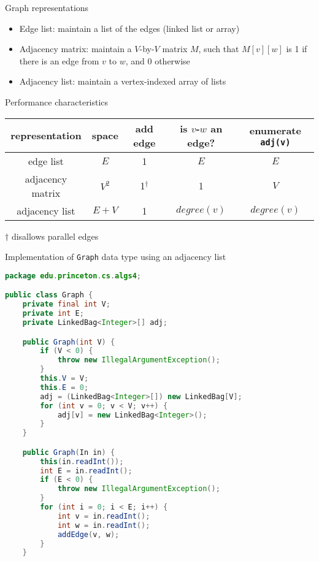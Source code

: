 \documentclass[8pt,a4paper,compress]{beamer}
\begin{document}
\begin{frame}[fragile]
\pause

Graph representations
\begin{itemize}
\item Edge list: maintain a list of the edges (linked list or array)

\item Adjacency matrix: maintain a $V$-by-$V$ matrix $M$, such that $M[v][w]$ is 1 if there is an edge from $v$ to $w$, and 0 otherwise

\item Adjacency list: maintain a vertex-indexed array of lists
\end{itemize}

\pause
\bigskip

Performance characteristics
\begin{center}
\begin{tabular}{ccccc}
representation & space & add edge & is $v$-$w$ an edge? & enumerate \lstinline$adj(v)$ \\ \hline
edge list & $E$ & 1 & $E$ & $E$ \\
adjacency matrix & $V^2$ & 1$^\dagger$ & 1 & $V$ \\ 
adjacency list & $E+V$ & 1 & $degree(v)$ & $degree(v)$ 
\end{tabular}  

\smallskip

\small $\dagger$ disallows parallel edges
\end{center}
\end{frame}

\begin{frame}[fragile]
\pause

Implementation of \lstinline{Graph} data type using an adjacency list
\begin{lstlisting}[language=Java]
package edu.princeton.cs.algs4;

public class Graph {
    private final int V;
    private int E;
    private LinkedBag<Integer>[] adj;

    public Graph(int V) {
        if (V < 0) {
            throw new IllegalArgumentException(); 
        }
        this.V = V;
        this.E = 0;
        adj = (LinkedBag<Integer>[]) new LinkedBag[V];
        for (int v = 0; v < V; v++) {
            adj[v] = new LinkedBag<Integer>();
        }
    }

    public Graph(In in) {
        this(in.readInt());
        int E = in.readInt();
        if (E < 0) { 
            throw new IllegalArgumentException();
        }
        for (int i = 0; i < E; i++) {
            int v = in.readInt();
            int w = in.readInt();
            addEdge(v, w);
        }
    }
\end{lstlisting}
\end{frame}
\end{document}
